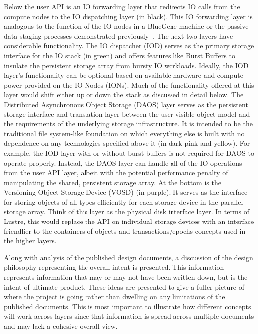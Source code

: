 \documentclass[conference]{IEEEtran}
\begin{document}
Below the user API is an IO forwarding layer that redirects IO calls from the
compute nodes to the IO dispatching layer (in black).  This IO forwarding layer
is analogous to the function of the IO nodes in a BlueGene machine or the
passive data staging processes demonstrated
previously~\cite{nisar:2008:staging,Abbasi:2009:datatap}. The next two layers
have considerable functionality. The IO dispatcher (IOD) serves as the primary
storage interface for the IO stack (in green) and offers features like Burst
Buffers to insulate the persistent storage array from bursty IO workloads.
Ideally, the IOD layer's functionality can be optional based on available
hardware and compute power provided on the IO Nodes (IONs). Much of the
functionality offered at this layer would shift either up or down the stack as
discussed in detail below. The Distributed Asynchronous Object Storage (DAOS)
layer serves as the persistent storage interface and translation layer between
the user-visible object model and the requirements of the underlying storage
infrastructure. It is intended to be the traditional file system-like
foundation on which everything else is built with no dependence on any
technologies specified above it (in dark pink and yellow). For example, the IOD
layer with or without burst buffers is not required for DAOS to operate
properly.  Instead, the DAOS layer can handle all of the IO operations from the
user API layer, albeit with the potential performance penalty of manipulating
the shared, persistent storage array. At the bottom is the Versioning Object
Storage Device (VOSD) (in purple).  It serves as the interface for storing
objects of all types efficiently for each storage device in the parallel
storage array. Think of this layer as the physical disk interface layer. In
terms of Lustre, this would replace the API on individual storage devices with
an interface friendlier to the containers of objects and transactions/epochs
concepts used in the higher layers.

Along with analysis of the published design documents, a discussion of the
design philosophy representing the overall intent is presented. This
information represents information that may or may not have been written down,
but is the intent of ultimate product.  These ideas are presented to give a
fuller picture of where the project is going rather than dwelling on any
limitations of the published documents. This is most important to illustrate
how different concepts will work across layers since that information is spread
across multiple documents and may lack a cohesive overall view.
\end{document}
